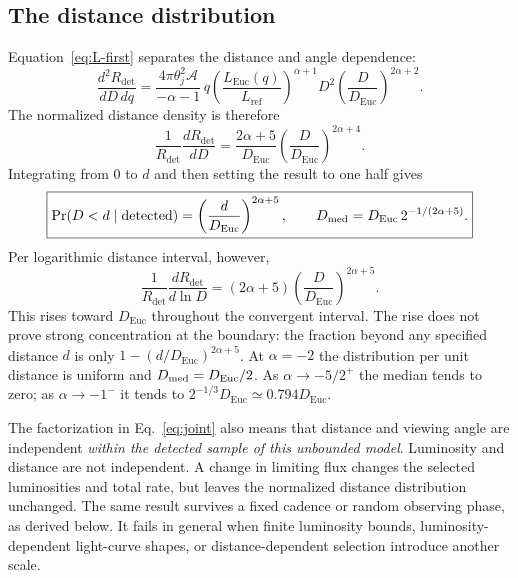 \documentclass[11pt,a4paper]{article}
\newcommand{\Euc}{\mathrm{Euc}}
\newcommand{\Lref}{L_{\mathrm{ref}}}
\newcommand{\Rdet}{R_{\mathrm{det}}}
\begin{document}
\subsection{The distance distribution}
Equation~\eqref{eq:L-first} separates the distance and angle dependence:
\begin{equation}
 \frac{d^2\Rdet}{dD\,dq}
 =\frac{4\pi\theta_j^2\mathcal A}{-\alpha-1}\,
 q\left(\frac{L_\Euc(q)}{\Lref}\right)^{\alpha+1}
 D^2\left(\frac D{D_\Euc}\right)^{2\alpha+2}.
 \label{eq:joint}
\end{equation}
The normalized distance density is therefore
\begin{equation}
 \frac1{\Rdet}\frac{d\Rdet}{dD}
 =\frac{2\alpha+5}{D_\Euc}
 \left(\frac D{D_\Euc}\right)^{2\alpha+4}.
 \label{eq:distance-density}
\end{equation}
Integrating from $0$ to $d$ and then setting the result to one half gives
\begin{equation}
 \boxed{\Pr(D<d\mid\mathrm{detected})
 =\left(\frac d{D_\Euc}\right)^{2\alpha+5},\qquad
 D_{\rm med}=D_\Euc\,2^{-1/(2\alpha+5)}.}
 \label{eq:distance-cdf}
\end{equation}
Per logarithmic distance interval, however,
\begin{equation}
 \frac1{\Rdet}\frac{d\Rdet}{d\ln D}
 =(2\alpha+5)\left(\frac D{D_\Euc}\right)^{2\alpha+5}.
 \label{eq:logD}
\end{equation}
This rises toward $D_\Euc$ throughout the convergent interval. The rise does
not prove strong concentration at the boundary: the fraction beyond any
specified distance $d$ is only $1-(d/D_\Euc)^{2\alpha+5}$.
At $\alpha=-2$ the distribution per unit distance is uniform and
$D_{\rm med}=D_\Euc/2$. As $\alpha\to-5/2^+$ the median tends to zero;
as $\alpha\to-1^-$ it tends to $2^{-1/3}D_\Euc\simeq0.794D_\Euc$.

The factorization in Eq.~\eqref{eq:joint} also means that distance and
viewing angle are independent \emph{within the detected sample of this
unbounded model}. Luminosity and distance are not independent.
A change in limiting flux changes the selected luminosities and total rate,
but leaves the normalized distance distribution unchanged. The same result
survives a fixed cadence or random observing phase, as derived below.
It fails in general when finite luminosity bounds, luminosity-dependent
light-curve shapes, or distance-dependent selection introduce another scale.
\end{document}
